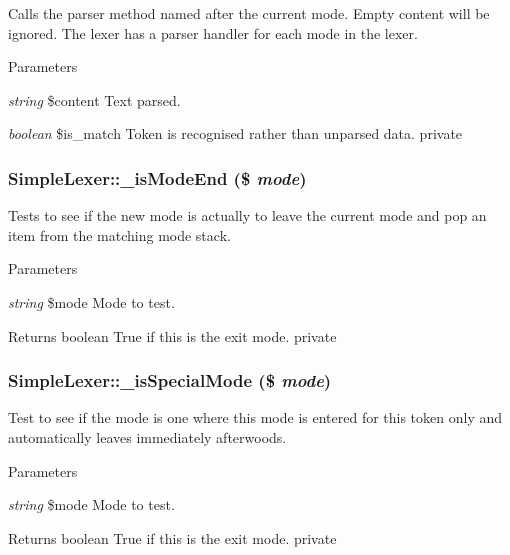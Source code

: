 \label{class_simple_lexer_a287ef4470e221f5b348fbda97a88a70f}
Calls the parser method named after the current mode. Empty content will be ignored. The lexer has a parser handler for each mode in the lexer. 
\begin{DoxyParams}{Parameters}
\item[{\em string}]\$content Text parsed. \item[{\em boolean}]\$is\_\-match Token is recognised rather than unparsed data.  private \end{DoxyParams}
\hypertarget{class_simple_lexer_a681e5891f263a352e8502f8196b541fc}{
\subsubsection[{\_\-isModeEnd}]{\setlength{\rightskip}{0pt plus 5cm}SimpleLexer::\_\-isModeEnd (\$ {\em mode})}}
\label{class_simple_lexer_a681e5891f263a352e8502f8196b541fc}
Tests to see if the new mode is actually to leave the current mode and pop an item from the matching mode stack. 
\begin{DoxyParams}{Parameters}
\item[{\em string}]\$mode Mode to test. \end{DoxyParams}
\begin{DoxyReturn}{Returns}
boolean True if this is the exit mode.  private 
\end{DoxyReturn}
\hypertarget{class_simple_lexer_a419cf4b1b734f60af7a867f352decbd1}{
\subsubsection[{\_\-isSpecialMode}]{\setlength{\rightskip}{0pt plus 5cm}SimpleLexer::\_\-isSpecialMode (\$ {\em mode})}}
\label{class_simple_lexer_a419cf4b1b734f60af7a867f352decbd1}
Test to see if the mode is one where this mode is entered for this token only and automatically leaves immediately afterwoods. 
\begin{DoxyParams}{Parameters}
\item[{\em string}]\$mode Mode to test. \end{DoxyParams}
\begin{DoxyReturn}{Returns}
boolean True if this is the exit mode.  private 
\end{DoxyReturn}
